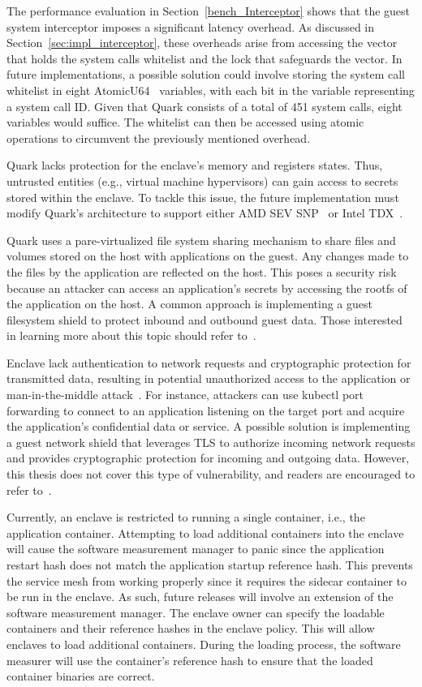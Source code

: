 The performance evaluation in Section~\ref{bench_Interceptor} shows that the guest system interceptor imposes a significant latency overhead. As discussed in Section~\ref{sec:impl_interceptor}, these overheads arise from accessing the vector that holds the system calls whitelist and the lock that safeguards the vector. In future implementations, 
a possible solution could involve storing the system call whitelist in eight AtomicU64~\cite*{rust_automic_u64} variables, with each bit in the variable representing a system call ID. Given that Quark consists of a total of 451 system calls, eight variables would suffice. The whitelist can then be accessed using atomic 
operations to circumvent the previously mentioned overhead.

Quark lacks protection for the enclave's memory and registers states. Thus, untrusted entities (e.g., virtual machine hypervisors) can gain access to secrets stored within the enclave. To tackle this issue, the future implementation must modify Quark's architecture to support either AMD SEV SNP~\cite*{SEV_SNP_white_book} 
or Intel TDX~\cite*{Intel_tdx_whitepaper}.

Quark uses a pare-virtualized file system sharing mechanism to share files and volumes stored on the host with applications on the guest. Any changes made to the files by the application are reflected on the host. This poses a security risk because an attacker can access an application's secrets by 
accessing the rootfs of the application on the host. A common approach is implementing a guest filesystem shield to protect inbound and outbound guest data. Those interested in learning more about this topic should refer to~\cite*{file_system_shield}.

Enclave lack authentication to network requests and cryptographic protection for transmitted data, resulting in potential unauthorized access to the application or man-in-the-middle attack~\cite*{Man_in_the_middle_attack}. For instance, attackers can use kubectl port forwarding to connect to an 
application listening on the target port and acquire the application's confidential data or service. A possible solution is implementing a guest network shield that leverages TLS to authorize incoming network requests and provides cryptographic protection for incoming and outgoing data. However, this thesis does not cover this 
type of vulnerability, and readers are encouraged to refer to~\cite*{network_shiled}.

Currently, an enclave is restricted to running a single container, i.e., the application container. Attempting to load additional containers into the enclave will cause the software measurement manager to panic since the application restart hash does not match the application startup reference hash. 
This prevents the service mesh from working properly since it requires the sidecar container to be run in the enclave. As such,  future releases will involve an extension of the software measurement manager. The enclave owner can specify the loadable containers and their reference hashes in the 
enclave policy. This will allow enclaves to load additional containers. During the loading process, the software measurer will use the container's reference hash to ensure that the loaded container binaries are correct.


